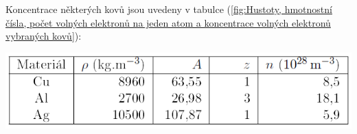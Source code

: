 \documentclass[a4paper,11pt]{article}
\begin{document}
\begin{minipage}[t]{0.5\textwidth}
        \par Koncentrace některých kovů jsou uvedeny v tabulce (\ref{fig:Hustoty, hmotnostní čísla, počet volných elektronů na jeden atom a koncentrace volných elektronů vybraných kovů}):
        \par
        \vspace{10pt}
        \centering
        \includegraphics[scale=0.5]{Hustoty, hmotnostní čísla, počet volných elektronů na jeden atom a koncentrace volných elektronů vybraných kovů}
        \captionsetup{justification=centering, font=footnotesize}
        \label{fig:Hustoty, hmotnostní čísla, počet volných elektronů na jeden atom a koncentrace volných elektronů vybraných kovů}
        \vspace{10pt}
    \end{minipage}
    \hspace{10pt}  
\end{document}

